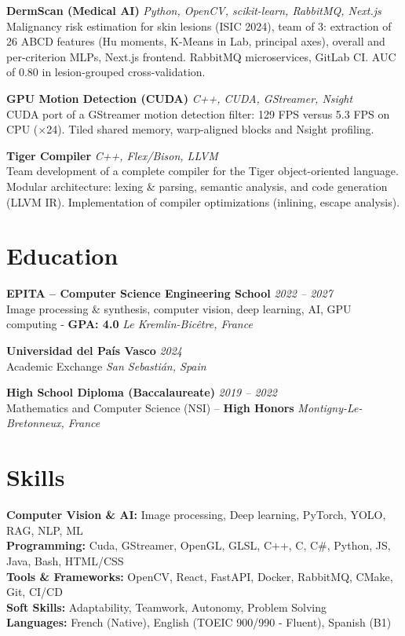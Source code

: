 \documentclass[10pt,a4paper]{article}
\begin{document}
\noindent
\textbf{DermScan (Medical AI)} \hfill \textit{Python, OpenCV, scikit-learn, RabbitMQ, Next.js} \\
Malignancy risk estimation for skin lesions (ISIC 2024), team of 3: extraction of 26 ABCD features (Hu moments, K-Means in Lab, principal axes), overall and per-criterion MLPs, Next.js frontend. RabbitMQ microservices, GitLab CI. AUC of 0.80 in lesion-grouped cross-validation.


\noindent
\textbf{GPU Motion Detection (CUDA)} \hfill \textit{C++, CUDA, GStreamer, Nsight} \\
CUDA port of a GStreamer motion detection filter: 129 FPS versus 5.3 FPS on CPU ($\times$24). Tiled shared memory, warp-aligned blocks and Nsight profiling.


\noindent
\textbf{Tiger Compiler} \hfill \textit{C++, Flex/Bison, LLVM} \\
Team development of a complete compiler for the Tiger object-oriented language. Modular architecture: lexing \& parsing, semantic analysis, and code generation (LLVM IR). Implementation of compiler optimizations (inlining, escape analysis).

\section*{Education}

\noindent
\textbf{EPITA – Computer Science Engineering School} \hfill \textit{2022 -- 2027} \\
Image processing \& synthesis, computer vision, deep learning, AI, GPU computing - \textbf{GPA: 4.0} \hfill \textit{Le Kremlin-Bicêtre, France}



\noindent
\textbf{Universidad del País Vasco} \hfill \textit{2024} \\
Academic Exchange \hfill \textit{San Sebastián, Spain}



\noindent
\textbf{High School Diploma (Baccalaureate)} \hfill \textit{2019 -- 2022} \\
Mathematics and Computer Science (NSI) -- \textbf{High Honors} \hfill \textit{Montigny-Le-Bretonneux, France}

\section*{Skills}

\noindent
\textbf{Computer Vision \& AI:} Image processing, Deep learning, PyTorch, YOLO, RAG, NLP, ML \\
\textbf{Programming:} Cuda, GStreamer, OpenGL, GLSL, C++, C, C\#, Python, JS, Java, Bash, HTML/CSS \\
\textbf{Tools \& Frameworks:} OpenCV, React, FastAPI, Docker, RabbitMQ, CMake, Git, CI/CD \\
\textbf{Soft Skills:} Adaptability, Teamwork, Autonomy, Problem Solving \\
\textbf{Languages:} French (Native), English (TOEIC 900/990 - Fluent), Spanish (B1)
\end{document}
